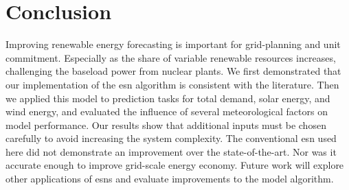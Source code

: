 \section{Conclusion}

Improving renewable energy forecasting is important for grid-planning
and unit commitment. Especially as the share of variable renewable resources
increases, challenging the baseload power from nuclear plants. We first
demonstrated that our implementation of the \gls{esn} algorithm is consistent
with the literature. Then we applied this model to prediction tasks for
total demand, solar energy, and wind energy, and evaluated the influence of
several meteorological factors on model performance. Our results show that
additional inputs must be chosen carefully to avoid increasing the system
complexity.
The conventional \gls{esn} used here did not demonstrate an
improvement over the state-of-the-art. Nor was it accurate enough to improve
grid-scale energy economy. Future work will explore other applications of \glspl{esn} and evaluate improvements to the model algorithm.
